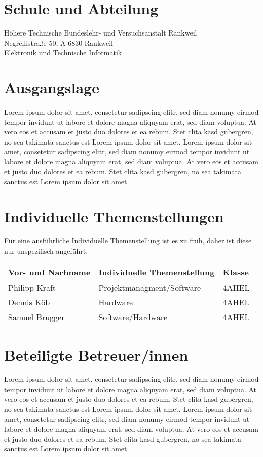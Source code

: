 \documentclass[11pt]{article}
\begin{document}
\section{Schule und Abteilung}
Höhere Technische Bundeslehr- und Versuchsanstalt Rankweil\\
Negrellistraße 50, A-6830 Rankweil\\
Elektronik und Technische Informatik\\
\section{Ausgangslage}
Lorem ipsum dolor sit amet, consetetur sadipscing elitr, sed diam nonumy eirmod tempor invidunt ut labore et dolore magna aliquyam erat, sed diam voluptua. At vero eos et accusam et justo duo dolores et ea rebum. Stet clita kasd gubergren, no sea takimata sanctus est Lorem ipsum dolor sit amet. Lorem ipsum dolor sit amet, consetetur sadipscing elitr, sed diam nonumy eirmod tempor invidunt ut labore et dolore magna aliquyam erat, sed diam voluptua. At vero eos et accusam et justo duo dolores et ea rebum. Stet clita kasd gubergren, no sea takimata sanctus est Lorem ipsum dolor sit amet.

\section{Individuelle Themenstellungen}
Für eine ausführliche Individuelle Themenstellung ist es zu früh, daher ist diese nur unspezifisch angeführt.

\begin{table}[htb]
  \begin{tabular}{|l|l|l|}
    \hline
    \textbf{Vor- und Nachname} & \textbf{Individuelle Themenstellung} & \textbf{Klasse} \\ \hline
    Philipp Kraft              & Projektmanagment/Software            & 4AHEL           \\ \hline
    Dennis Köb                 & Hardware                             & 4AHEL           \\ \hline
    Samuel Brugger             & Software/Hardware                    & 4AHEL           \\ \hline
  \end{tabular}
\end{table}

\section{Beteiligte Betreuer/innen}
Lorem ipsum dolor sit amet, consetetur sadipscing elitr, sed diam nonumy eirmod tempor invidunt ut labore et dolore magna aliquyam erat, sed diam voluptua. At vero eos et accusam et justo duo dolores et ea rebum. Stet clita kasd gubergren, no sea takimata sanctus est Lorem ipsum dolor sit amet. Lorem ipsum dolor sit amet, consetetur sadipscing elitr, sed diam nonumy eirmod tempor invidunt ut labore et dolore magna aliquyam erat, sed diam voluptua. At vero eos et accusam et justo duo dolores et ea rebum. Stet clita kasd gubergren, no sea takimata sanctus est Lorem ipsum dolor sit amet.
\end{document}
